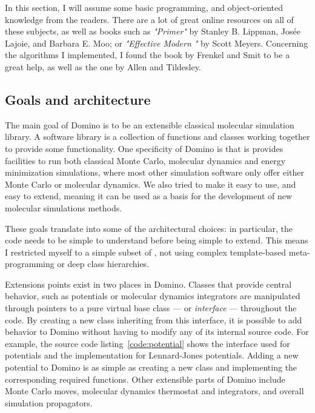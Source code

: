 \documentclass[thesis]{subfiles}
\begin{document}
In this section, I will assume some basic programming, \cxx and object-oriented
knowledge from the readers. There are a lot of great online resources on all of
these subjects, as well as books such as \emph{"\cxx Primer"} by Stanley B.
Lippman, Josée Lajoie, and Barbara E. Moo; or \emph{"Effective Modern \cxx"} by
Scott Meyers. Concerning the algorithms I implemented, I found the book by
Frenkel and Smit\cite{Frenkel2002} to be a great help, as well as the one by
Allen and Tildesley\cite{Allen2017}.

\subsection{Goals and architecture}

The main goal of Domino is to be an extensible classical molecular simulation
library. A software library is a collection of functions and classes working
together to provide some functionality. One specificity of Domino is that is
provides facilities to run both classical Monte Carlo, molecular dynamics and
energy minimization simulations, where most other simulation software only offer
either Monte Carlo or molecular dynamics. We also tried to make it easy to use,
and easy to extend, meaning it can be used as a basis for the development of new
molecular simulations methods.

These goals translate into some of the architectural choices: in particular, the
code needs to be simple to understand before being simple to extend. This means
I restricted myself to a simple subset of \cxx, not using complex template-based
meta-programming or deep class hierarchies.

Extensions points exist in two places in Domino. Classes that provide central
behavior, such as potentials or molecular dynamics integrators are manipulated
through pointers to a pure virtual base class --- or \emph{interface} ---
throughout the code. By creating a new class inheriting from this interface, it
is possible to add behavior to Domino without having to modify any of its
internal source code. For example, the source code listing~\ref{code:potential}
shows the interface used for potentials and the implementation for Lennard-Jones
potentials. Adding a new potential to Domino is as simple as creating a new
class and implementing the corresponding required functions. Other extensible
parts of Domino include Monte Carlo moves, molecular dynamics thermostat and
integrators, and overall simulation propagators.
\end{document}
